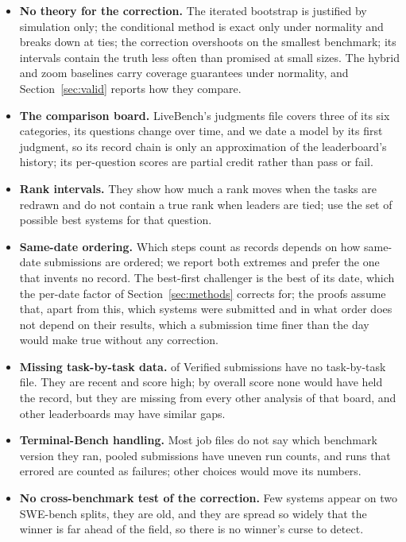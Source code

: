 \documentclass[11pt]{article}
\begin{document}
\begin{itemize}
\item \textbf{No theory for the correction.} The iterated bootstrap is justified by simulation only; the conditional method is exact only under normality and breaks down at ties; the correction overshoots on the smallest benchmark; its intervals contain the truth less often than promised at small sizes. The hybrid and zoom baselines carry coverage guarantees under normality, and Section~\ref{sec:valid} reports how they compare.
\item \textbf{The comparison board.} LiveBench's judgments file covers three of its six categories, its questions change over time, and we date a model by its first judgment, so its record chain is only an approximation of the leaderboard's history; its per-question scores are partial credit rather than pass or fail.
\item \textbf{Rank intervals.} They show how much a rank moves when the tasks are redrawn and do not contain a true rank when leaders are tied; use the set of possible best systems for that question.
\item \textbf{Same-date ordering.} Which steps count as records depends on how same-date submissions are ordered; we report both extremes and prefer the one that invents no record. The best-first challenger is the best of its date, which the per-date factor of Section~\ref{sec:methods} corrects for; the proofs assume that, apart from this, which systems were submitted and in what order does not depend on their results, which a submission time finer than the day would make true without any correction.
\item \textbf{Missing task-by-task data.} \NumMissingN{} of \NumMissingFound{} Verified submissions have no task-by-task file. They are recent and score high; by overall score none would have held the record, but they are missing from every other analysis of that board, and other leaderboards may have similar gaps.
\item \textbf{Terminal-Bench handling.} Most job files do not say which benchmark version they ran, pooled submissions have uneven run counts, and runs that errored are counted as failures; other choices would move its numbers.
\item \textbf{No cross-benchmark test of the correction.} Few systems appear on two SWE-bench splits, they are old, and they are spread so widely that the winner is far ahead of the field, so there is no winner's curse to detect.
\end{itemize}
\end{document}
